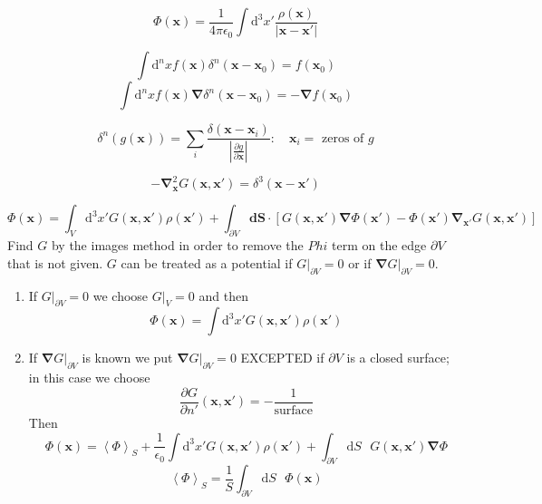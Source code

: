 $$
\Phi(\boldsymbol{x}) = \frac{1}{4\pi \epsilon_0} \int \text{d}^3x' \frac{\rho(\boldsymbol{x})}{|\boldsymbol{x}-\boldsymbol{x}'|}
$$

$$\int \text{d}^nx f(\boldsymbol{x})\delta^n(\boldsymbol{x}-\boldsymbol{x}_0)= f(\boldsymbol{x}_0)
$$
$$
\int \text{d}^nx f(\boldsymbol{x})\boldsymbol{\nabla}\delta^n(\boldsymbol{x}-\boldsymbol{x}_0)= - \boldsymbol{\nabla}f(\boldsymbol{x}_0)
$$

$$
\delta^n(g(\boldsymbol{x})) = \sum_i \frac{\delta(\boldsymbol{x}-\boldsymbol{x}_i)}{\left|\frac{\partial g}{\partial \boldsymbol{x}} \right| } : \quad \boldsymbol{x}_i = \text{ zeros of }g
$$

$$
-\boldsymbol{\nabla}_{\boldsymbol{x}}^2 G(\boldsymbol{x}, \boldsymbol{x}') = \delta^3(\boldsymbol{x}-\boldsymbol{x}')
$$

$$
\Phi(\boldsymbol{x}) = \int_V \text{d}^3 x' G(\boldsymbol{x}, \boldsymbol{x}')\rho(\boldsymbol{x}') + \int_{\partial V} \boldsymbol{dS} \cdot \left[G(\boldsymbol{x}, \boldsymbol{x}')\boldsymbol{\nabla}\Phi(\boldsymbol{x}')-\Phi(\boldsymbol{x}')\boldsymbol{\nabla}_{\boldsymbol{x}'}G(\boldsymbol{x}, \boldsymbol{x}')\right]
$$
Find $G$ by the images method in order to remove the $Phi$ term on the edge $\partial V$ that is not given. $G$ can be treated as a potential if $G|_{\partial V}=0$ or if $\boldsymbol{\nabla}G|_{\partial V}=0$. 

\begin{enumerate}
\item If $G|_{\partial V}=0$ we choose $G|_V =0$ and then
$$
\Phi(\boldsymbol{x}) = \int \text{d}^3x' G(\boldsymbol{x}, \boldsymbol{x}')\rho(\boldsymbol{x}')
$$
\item If $\boldsymbol{\nabla}G|_{\partial V}$ is known we put $\boldsymbol{\nabla} G |_{\partial V}=0$ EXCEPTED if $\partial V$ is a closed surface; in this case we choose
$$
\frac{\partial G}{\partial n'}(\boldsymbol{x}, \boldsymbol{x}')= -\frac{1}{\text{surface}}
$$
Then
$$
\Phi(\boldsymbol{x}) = \left\langle \Phi \right\rangle _S + \frac{1}{\epsilon_0}\int \text{d}^3x' G(\boldsymbol{x}, \boldsymbol{x}')\rho(\boldsymbol{x}')+\int_{\partial V} \text{d}S \text{ } G(\boldsymbol{x}, \boldsymbol{x}')\boldsymbol{\nabla}\Phi
$$
$$
\left\langle \Phi \right\rangle _S = \frac{1}{S}\int_{\partial V} \text{d}S \text{ } \Phi(\boldsymbol{x})
$$

\end{enumerate}